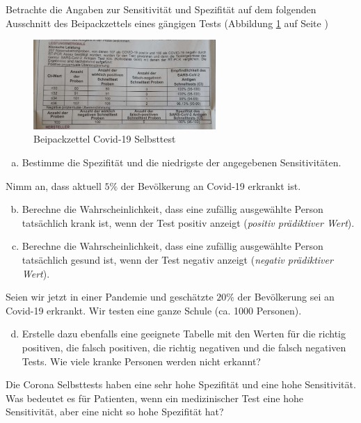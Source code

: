 \documentclass[%
11pt,%
twoside,%
titlepage,%
german,%
headsepline%
]{scrartcl}
\begin{document}
\begin{ueb}
Betrachte die Angaben zur Sensitivität und Spezifität auf dem folgenden Ausschnitt des Beipackzettels eines gängigen Tests (Abbildung \ref{fig:covidchart} auf Seite \pageref{fig:covidchart})

\begin{figure}
    \centering
    \includegraphics[width=0.618\textwidth]{pictures/Covidchart.jpeg}
    \caption{Beipackzettel Covid-19 Selbsttest}
    \label{fig:covidchart}
\end{figure}

\begin{enumerate}[a)]
    \item Bestimme die Spezifität und die niedrigste der angegebenen Sensitivitäten.
\end{enumerate}
Nimm an, dass aktuell $5\%$ der Bevölkerung an Covid-19 erkrankt ist.
\begin{enumerate}[a)]
\setcounter{enumi}{1}
    \item Berechne die Wahrscheinlichkeit, dass eine zufällig  ausgewählte Person  tatsächlich krank ist, wenn der Test positiv anzeigt (\emph{positiv prädiktiver Wert}).
    \item Berechne die Wahrscheinlichkeit, dass eine zufällig ausgewählte Person tatsächlich gesund ist, wenn der Test negativ anzeigt (\emph{negativ prädiktiver Wert}).
\end{enumerate}
Seien wir jetzt in einer Pandemie und gesch\"atzte $20\%$ der Bev\"olkerung sei an Covid-19 erkrankt. Wir testen eine ganze Schule (ca. 1000 Personen).
\begin{enumerate}[a)]
\setcounter{enumi}{3}
    \item Erstelle dazu ebenfalls eine geeignete Tabelle mit den Werten für die richtig positiven, die falsch positiven, die richtig negativen und die falsch negativen Tests.
Wie viele kranke Personen werden nicht erkannt?
\end{enumerate}
\end{ueb}

\begin{ueb}
Die Corona Selbsttests haben eine sehr hohe Spezifität und eine hohe Sensitivität. Was bedeutet es für Patienten, wenn ein medizinischer Test eine hohe Sensitivität, aber eine nicht so hohe Spezifität hat?
\end{ueb}
\end{document}
